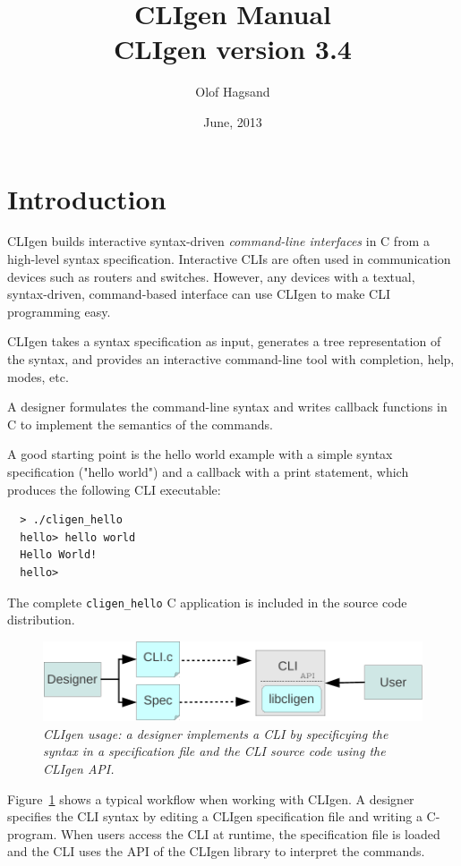 \documentclass[a4paper, 10pt] {article}
\title {CLIgen Manual\\ {\small CLIgen version 3.4}}
\author{Olof Hagsand}
\begin{document}
\date{June, 2013}
\maketitle
\setcounter{tocdepth}{2}
\tableofcontents
\newpage
\section{Introduction}
\label{sec:intro}

CLIgen builds interactive syntax-driven \emph{command-line interfaces}
in C from a high-level syntax specification. Interactive CLIs are
often used in communication devices such as routers and
switches. However, any devices with a textual, syntax-driven,
command-based interface can use CLIgen to make CLI programming easy.

CLIgen takes a syntax specification as input, generates a tree
representation of the syntax, and provides an interactive command-line
tool with completion, help, modes, etc.

A designer formulates the command-line syntax and writes callback
functions in C to implement the semantics of the commands.

A good starting point is the hello world example with a simple syntax
specification ("hello world") and a callback with a print statement,
which produces the following CLI executable:

\begin{verbatim}
  > ./cligen_hello 
  hello> hello world 
  Hello World!
  hello> 
\end{verbatim}

The complete {\tt cligen\_hello} C application is included in the
source code distribution.

\begin{figure}
\centering
\includegraphics[scale=0.8]{usage.pdf}
\caption{\em CLIgen usage: a designer implements a CLI by specificying the syntax in a specification file and the CLI source code using the CLIgen API.}
\label{fig:usage}
\end{figure}

Figure~\ref{fig:usage} shows a typical workflow when working with
CLIgen. A designer specifies the CLI syntax by editing a CLIgen
specification file and writing a C-program. When users access the CLI
at runtime, the specification file is loaded and the CLI uses the API
of the CLIgen library to interpret the commands.
\end{document}
